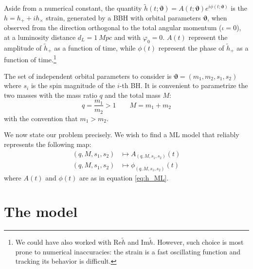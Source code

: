 Aside from a numerical constant, the quantity ${\tilde{h}(t; \boldsymbol{\vartheta}) = A(t; \boldsymbol{\vartheta}) e^{i \phi(t; \boldsymbol{\vartheta})}}$ is the $h = h_+ +i h_\times$ strain, generated by a BBH with orbital parameters $\boldsymbol{\vartheta}$, when observed from the direction orthogonal to the total angular momentum ($\iota =0$), at a luminosity distance $d_L = \SI{1}{Mpc}$ and with $\varphi_0 =0$.
$A(t)$ represent the amplitude of $\tilde{h}_+$ as a function of time, while $\phi(t)$ represent the phase of $\tilde{h}_+$ as a function of time.\footnote{
We could have also worked with $\mathrm{Re}{\tilde{h}}$ and $\mathrm{Im}{\tilde{h}}$. However, such choice is most prone to numerical inaccuracies: the strain is a fast oscillating function and tracking its behavior is difficult.}

The set of independent orbital parameters to consider is $\boldsymbol{\vartheta} = (m_1, m_2, s_1, s_2)$ where $s_i$ is the spin magnitude of the $i$-th BH.
It is convenient to parametrize the two masses with the mass ratio $q$ and the total mass $M$:
\begin{equation} \label{eq:def_q}
	q = \frac{m_1}{m_2} >1 \qquad M=m_1+m_2
\end{equation}
with the convention that $m_1>m_2$.
\par
We now state our problem precisely. We wish to find a ML model that reliably represents the following map:
\begin{align}
	(q, M, s_1, s_2) &\longmapsto A_{(q, M, s_1, s_2)}(t) \label{eq:objective_amp}\\
	(q, M, s_1, s_2) &\longmapsto \phi_{(q, M, s_1, s_2)}(t) \label{eq:objective_ph}
\end{align}
where $A(t)$ and $\phi(t)$ are as in equation \eqref{eq:h_ML}.

\section{The model}
%
